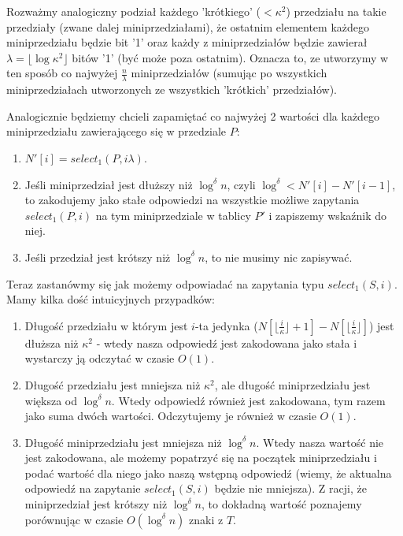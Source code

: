 \documentclass{article}
\begin{document}
Rozważmy analogiczny podział każdego 'krótkiego' ($< \kappa^2$) przedziału na takie przedziały (zwane dalej miniprzedziałami), że ostatnim elementem każdego miniprzedziału będzie bit '1' oraz każdy z miniprzedziałów będzie zawierał $\lambda = \lfloor \log{\kappa}^2 \rfloor$ bitów '1' (być może poza ostatnim). Oznacza to, ze utworzymy w ten sposób co najwyżej $\frac{n}{\lambda}$ miniprzedziałów (sumując po wszystkich miniprzedziałach utworzonych ze wszystkich 'krótkich' przedziałów).

Analogicznie będziemy chcieli zapamiętać co najwyżej 2 wartości dla każdego miniprzedziału zawierającego się w przedziale $P$:
\begin{enumerate}
    \item $N'[i] = select_1(P, i\lambda)$.
    \item Jeśli miniprzedział jest dłuższy niż $\log^{\delta}{n}$, czyli $\log^{\delta} < N'[i] - N'[i-1]$, to zakodujemy jako stałe odpowiedzi na wszystkie możliwe zapytania $select_1(P, i)$ na tym miniprzedziale w tablicy $P'$ i zapiszemy wskaźnik do niej.
    \item Jeśli przedział jest krótszy niż $\log^{\delta}{n}$, to nie musimy nic zapisywać.
\end{enumerate}

Teraz zastanówmy się jak możemy odpowiadać na zapytania typu $select_1(S, i)$. Mamy kilka dość intuicyjnych przypadków:

\begin{enumerate}
    \item Długość przedziału w którym jest $i$-ta jedynka ($N[\lfloor \frac{i}{\kappa} \rfloor + 1] - N[\lfloor \frac{i}{\kappa} \rfloor]$) jest dłuższa niż $\kappa^2$ - wtedy nasza odpowiedź jest zakodowana jako stała i wystarczy ją odczytać w czasie $O(1)$.
    \item Długość przedziału jest mniejsza niż $\kappa^2$, ale długość miniprzedziału jest większa od $\log^{\delta}{n}$. Wtedy odpowiedź również jest zakodowana, tym razem jako suma dwóch wartości. Odczytujemy je również w czasie $O(1)$.
    \item Długość miniprzedziału jest mniejsza niż $\log^{\delta}{n}$. Wtedy nasza wartość nie jest zakodowana, ale możemy popatrzyć się na początek miniprzedziału i podać wartość dla niego jako naszą wstępną odpowiedź (wiemy, że aktualna odpowiedź na zapytanie $select_1(S, i)$ będzie nie mniejsza). Z racji, że miniprzedział jest krótszy niż $\log^{\delta}{n}$, to dokładną wartość poznajemy porównując w czasie $O(\log^{\delta}{n})$ znaki z $T$.
\end{enumerate}
\end{document}
